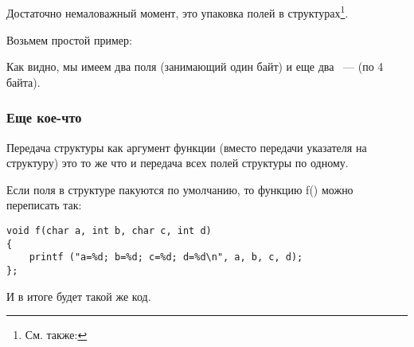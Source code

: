 \subsection{\StructurePackingSectionName}
\label{structure_packing}

Достаточно немаловажный момент, это упаковка полей в структурах\footnote{См. также: \URLWPDA}.

Возьмем простой пример:



Как видно, мы имеем два поля \Tchar (занимающий один байт) и еще два ~--- \Tint (по 4 байта).





\subsubsection{Еще кое-что}

Передача структуры как аргумент функции (вместо передачи указателя на структуру) это то же
что и передача всех полей структуры по одному.

Если поля в структуре пакуются по умолчанию, то функцию f() можно переписать так:

\begin{lstlisting}[style=customc]
void f(char a, int b, char c, int d)
{
    printf ("a=%d; b=%d; c=%d; d=%d\n", a, b, c, d);
};
\end{lstlisting}

И в итоге будет такой же код.

